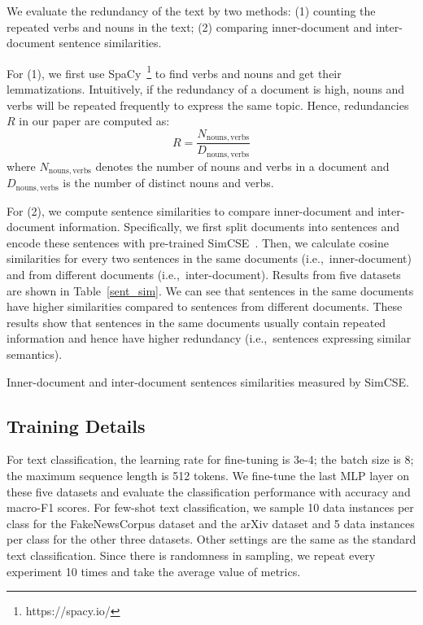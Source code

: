 \documentclass[11pt]{article}
\begin{document}
We evaluate the redundancy of the text by two methods: (1) counting the repeated verbs and nouns in the text; (2) comparing inner-document and inter-document sentence similarities.

For (1), we first use SpaCy~\footnote{https://spacy.io/} to find verbs and nouns and get their lemmatizations. Intuitively, if the redundancy of a document is high, nouns and verbs will be repeated frequently to express the same topic. Hence, redundancies $R$ in our paper are computed as:
\begin{equation}
    R = \frac{N_{\mathrm{nouns, verbs}}}{D_{\mathrm{nouns, verbs}}}
\end{equation}
where $N_{\mathrm{nouns, verbs}}$ denotes the number of nouns and verbs in a document and $D_{\mathrm{nouns, verbs}}$ is the number of distinct nouns and verbs.

For (2), we compute sentence similarities to compare inner-document and inter-document information. Specifically, we first split documents into sentences and encode these sentences with pre-trained SimCSE~\cite{Gao2021SimCSESC}. Then, we calculate cosine similarities for every two sentences in the same documents (i.e.,~inner-document) and from different documents (i.e.,~inter-document). Results from five datasets are shown in Table~\ref{sent_sim}. We can see that sentences in the same documents have higher similarities compared to sentences from different documents. These results show that sentences in the same documents usually contain repeated information and hence have higher redundancy (i.e.,~sentences expressing similar semantics).

\label{app:sent_sim}
\begin{table}[t]
    
    \caption{Inner-document and inter-document sentences similarities measured by SimCSE.}
    \label{sent_sim}
\end{table}

\subsection{Training Details}
\label{app:details}
For text classification, the learning rate for fine-tuning is 3e-4; the batch size is 8; the maximum sequence length is 512 tokens. 
We fine-tune the last MLP layer on these five datasets and evaluate the classification performance with accuracy and macro-F1 scores.
For few-shot text classification, we sample 10 data instances per class for the FakeNewsCorpus dataset and the arXiv dataset and 5 data instances per class for the other three datasets. 
Other settings are the same as the standard text classification. 
Since there is randomness in sampling, we repeat every experiment 10 times and take the average value of metrics.
\end{document}
